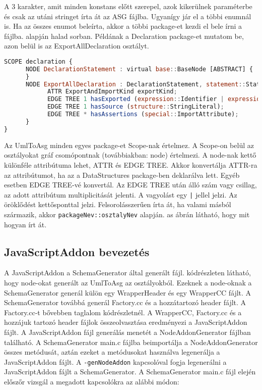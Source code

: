 A 3 karakter, amit minden konstans előtt szerepel, azok kikerülnek paraméterbe és csak az utáni stringet írta át az ASG fájlba.
Ugyanígy jár el a többi enumnál is.
Ha az összes enumot beleírta, akkor a többi package-et kezdi el bele írni a fájlba.  alapján halad sorban.
Példának a Declaration package-et mutatom be, azon belül is az ExportAllDeclaration osztályt.

\begin{lstlisting}[caption={ASG fájl ExportAllDeclaration},label={lst:asg_file_export_all_declaration}, language={JavaScript}]
SCOPE declaration {
      NODE DeclarationStatement : virtual base::BaseNode [ABSTRACT] {
      }
      NODE ExportAllDeclaration : DeclarationStatement, statement::Statement, virtual statement::ProgramStatement, special::Node {
            ATTR ExportAndImportKind exportKind;
            EDGE TREE 1 hasExported (expression::Identifier | expression::LiteralExpression);
            EDGE TREE 1 hasSource (structure::StringLiteral);
            EDGE TREE * hasAssertions (special::ImportAttribute);
      }
}
\end{lstlisting}

Az UmlToAsg minden egyes package-et Scope-nak értelmez.
A Scope-on belül az osztályokat gráf csomópontnak (továbbiakban: node) értelmezi.
A node-nak kettő különféle attribútuma lehet, ATTR és EDGE TREE.
Akkor konvertálja ATTR-ra az attribútumot, ha az a DataStructures package-ben deklarálva lett. Egyéb esetben EDGE TREE-vé konvertál.
Az EDGE TREE után álló szám vagy csillag, az adott attribútum multiplicitását jelenti.
A vagyolást egy \texttt{|} jellel jelzi.
Az öröklődést kettősponttal jelzi.
Felsorolásszerűen írta át, ha valami másból származik, akkor \texttt{packageNev::osztalyNev} alapján.
as ábrán látható, hogy mit hogyan írt át.

\subsection{JavaScriptAddon bevezetés}\label{chap:javaScriptAddon_bevezetes}

\noindent

A JavaScriptAddon a SchemaGenerator által generált fájl.
 kódrészleten látható, hogy node-okat generált az UmlToAsg az osztályokból.
Ezeknek a node-oknak a SchemaGenerator generál külön egy WrapperHeader és egy WrapperCC fájlt.
A SchemaGenerator továbbá generál Factory.cc és a hozzátartozó header fájlt. A Factory.cc-t bővebben taglalom  kódrészletnél.
A WrapperCC, Factory.cc és a hozzájuk tartozó header fájlok összeolvasztása eredményezi a JavaScriptAddon fájlt.
A JavaScriptAddon fájl generálás menetét a NodeAddonGenerator fájlban található.
A SchemaGenerator main.c fájlba beimportálja a NodeAddonGenerator összes metódusát, aztán ezeket a metódusokat használva legenerálja a JavaScriptAddon fájlt.
A \texttt{-genNodeAddon} kapcsolóval fogja legenerálni a JavaScriptAddon fájlt a SchemaGenerator.
A SchemaGenerator main.c fájl elején előszőr vizsgál a megadott kapcsolókra az alábbi módon:

